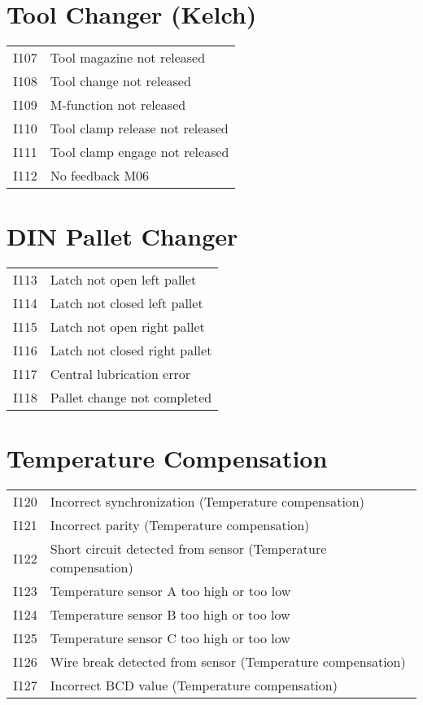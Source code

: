 \documentclass[openany,11pt]{book}
\begin{document}
\section*{Tool Changer (Kelch)}

\begin{table}[!h]
    \begin{tabular}{ll}
    I107 & Tool magazine not released \\
    I108 & Tool change not released \\
    I109 & M-function not released \\
    I110 & Tool clamp release not released \\
    I111 & Tool clamp engage not released \\
    I112 & No feedback M06 \\
    \end{tabular}
\end{table}

\section*{DIN Pallet Changer}

\begin{table}[!h]
    \begin{tabular}{ll}
    I113 & Latch not open left pallet \\
    I114 & Latch not closed left pallet \\
    I115 & Latch not open right pallet \\
    I116 & Latch not closed right pallet \\
    I117 & Central lubrication error \\
    I118 & Pallet change not completed \\
    \end{tabular}
\end{table}

\section*{Temperature Compensation}

\begin{table}[!h]
    \begin{tabular}{ll}
    I120 & Incorrect synchronization (Temperature compensation) \\
    I121 & Incorrect parity (Temperature compensation) \\
    I122 & Short circuit detected from sensor (Temperature compensation) \\
    I123 & Temperature sensor A too high or too low \\
    I124 & Temperature sensor B too high or too low \\
    I125 & Temperature sensor C too high or too low \\
    I126 & Wire break detected from sensor (Temperature compensation) \\
    I127 & Incorrect BCD value (Temperature compensation) \\
    \end{tabular}
\end{table}
\end{document}
